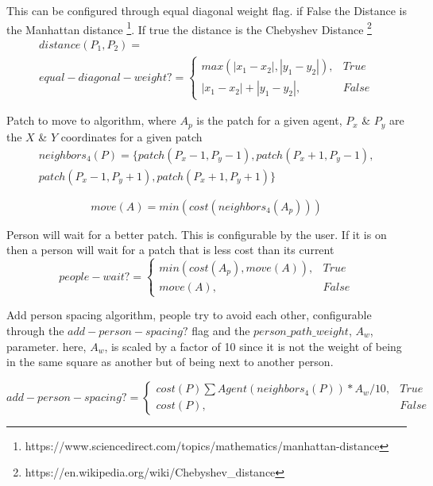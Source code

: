 \documentclass[12pt,letterpaper]{article}
\begin{document}
This can be configured through equal diagonal weight flag. if False the Distance is the Manhattan distance \footnote{ https://www.sciencedirect.com/topics/mathematics/manhattan-distance}. If true the distance is the Chebyshev Distance \footnote{https://en.wikipedia.org/wiki/Chebyshev\_distance}
\begin{align}
distance(P_1, P_2)  = \nonumber\\
equal-diagonal-weight?=
\begin{cases}
	max(|x_1-x_2|, |y_1-y_2|), & True \\
	|x_1-x_2|+ |y_1-y_2|, & False
\end{cases}
\end{align}


Patch to move to algorithm, where $A_p$ is the patch for a given agent, $P_x$ \& $P_y$ are the $X$ \& $Y$ coordinates for a given patch
\begin{align}
neighbors_4 (P)  = \{patch(P_x - 1, P_y -1), patch(P_x + 1, P_y -1), \nonumber \\ 
patch(P_x - 1, P_y + 1),patch(P_x + 1, P_y + 1)\}   
\end{align}

\begin{equation}
move(A) = min(cost(neighbors_4 (A_p)))
\end{equation}

Person will wait for a better patch.  This is configurable by the user. If it is on then a person will wait for a patch that is less cost than its current
\begin{equation}
people-wait?=
\begin{cases}
min(cost(A_p), move(A)), & True\\
move(A), & False
\end{cases}
\end{equation}

Add person spacing algorithm, people try to avoid each other, configurable through the $add-person-spacing?$ flag and the $person\_path\_weight$, $A_w$, parameter.  here, $A_w$, is scaled by a factor of 10 since it is not the weight of being in the same square as another but of being next to another person.

\begin{equation}
add-person-spacing?=
\begin{cases}
	cost(P) \sum Agent(neighbors_4(P)) * A_w / 10, & True \\
	cost(P), & False
\end{cases}
\end{equation}
\end{document}
